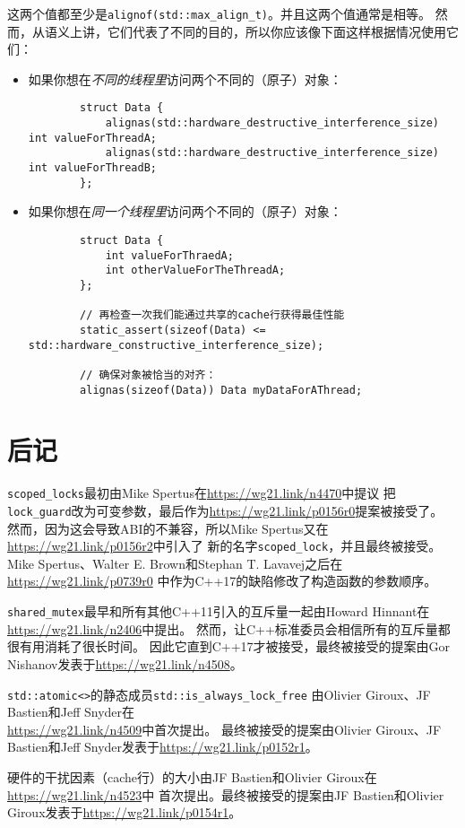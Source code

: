 这两个值都至少是\texttt{alignof(std::max\_align\_t)}。并且这两个值通常是相等。
然而，从语义上讲，它们代表了不同的目的，所以你应该像下面这样根据情况使用它们：
\begin{itemize}
    \item 如果你想在\emph{不同的线程里}访问两个不同的（原子）对象：
    \begin{lstlisting}
        struct Data {
            alignas(std::hardware_destructive_interference_size) int valueForThreadA;
            alignas(std::hardware_destructive_interference_size) int valueForThreadB;
        };
    \end{lstlisting}
    \item 如果你想在\emph{同一个线程里}访问两个不同的（原子）对象：
    \begin{lstlisting}
        struct Data {
            int valueForThraedA;
            int otherValueForTheThreadA;
        };

        // 再检查一次我们能通过共享的cache行获得最佳性能
        static_assert(sizeof(Data) <= std::hardware_constructive_interference_size);

        // 确保对象被恰当的对齐：
        alignas(sizeof(Data)) Data myDataForAThread;
    \end{lstlisting}
\end{itemize}

\section{后记}
\texttt{scoped\_locks}最初由Mike Spertus在\url{https://wg21.link/n4470}中提议
把\texttt{lock\_guard}改为可变参数，最后作为\url{https://wg21.link/p0156r0}提案被接受了。
然而，因为这会导致ABI的不兼容，所以Mike Spertus又在\url{https://wg21.link/p0156r2}中引入了
新的名字\texttt{scoped\_lock}，并且最终被接受。
Mike Spertus、Walter E. Brown和Stephan T. Lavavej之后在\url{https://wg21.link/p0739r0}
中作为C++17的缺陷修改了构造函数的参数顺序。

\texttt{shared\_mutex}最早和所有其他C++11引入的互斥量一起由Howard Hinnant在
\url{https://wg21.link/n2406}中提出。
然而，让C++标准委员会相信所有的互斥量都很有用消耗了很长时间。
因此它直到C++17才被接受，最终被接受的提案由Gor Nishanov发表于\url{https://wg21.link/n4508}。

\texttt{std::atomic<>}的静态成员\texttt{std::is\_always\_lock\_free}
由Olivier Giroux、JF Bastien和Jeff Snyder在\\
\url{https://wg21.link/n4509}中首次提出。
最终被接受的提案由Olivier Giroux、JF Bastien和Jeff Snyder发表于\url{https://wg21.link/p0152r1}。

硬件的干扰因素（cache行）的大小由JF Bastien和Olivier Giroux在\url{https://wg21.link/n4523}中
首次提出。最终被接受的提案由JF Bastien和Olivier Giroux发表于\url{https://wg21.link/p0154r1}。
